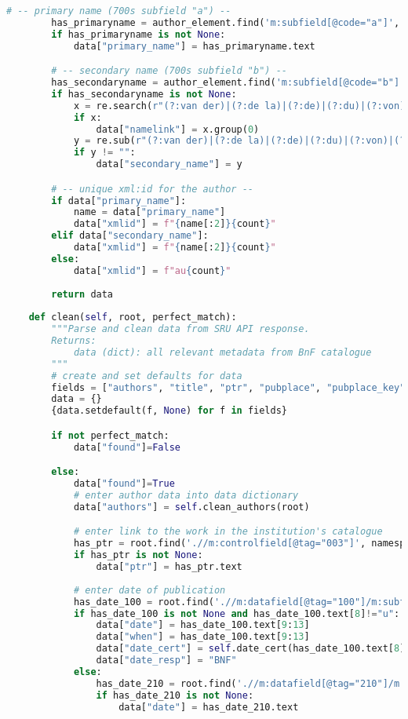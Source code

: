 \documentclass[class=article, crop=false]{standalone}
\begin{document}
\begin{lstlisting}[language=python, style=python]
        # -- primary name (700s subfield "a") --
        has_primaryname = author_element.find('m:subfield[@code="a"]', namespaces=NS)
        if has_primaryname is not None:
            data["primary_name"] = has_primaryname.text

        # -- secondary name (700s subfield "b") --
        has_secondaryname = author_element.find('m:subfield[@code="b"]', namespaces=NS)
        if has_secondaryname is not None:
            x = re.search(r"(?:van der)|(?:de la)|(?:de)|(?:du)|(?:von)|(?:van)", has_secondaryname.text)
            if x:
                data["namelink"] = x.group(0)
            y = re.sub(r"(?:van der)|(?:de la)|(?:de)|(?:du)|(?:von)|(?:van)","", has_secondaryname.text)
            if y != "":
                data["secondary_name"] = y

        # -- unique xml:id for the author --
        if data["primary_name"]:
            name = data["primary_name"]
            data["xmlid"] = f"{name[:2]}{count}"
        elif data["secondary_name"]:
            data["xmlid"] = f"{name[:2]}{count}"
        else:
            data["xmlid"] = f"au{count}"
        
        return data
    
    def clean(self, root, perfect_match):
        """Parse and clean data from SRU API response.
        Returns:
            data (dict): all relevant metadata from BnF catalogue
        """      
        # create and set defaults for data
        fields = ["authors", "title", "ptr", "pubplace", "pubplace_key", "publisher", "date", "when", "date_cert", "date_resp", "country", "idno", "objectdesc", "lang", "repo", "settlement"]
        data = {}
        {data.setdefault(f, None) for f in fields}

        if not perfect_match:
            data["found"]=False

        else:
            data["found"]=True
            # enter author data into data dictionary
            data["authors"] = self.clean_authors(root)

            # enter link to the work in the institution's catalogue
            has_ptr = root.find('.//m:controlfield[@tag="003"]', namespaces=NS)
            if has_ptr is not None:
                data["ptr"] = has_ptr.text
            
            # enter date of publication
            has_date_100 = root.find('.//m:datafield[@tag="100"]/m:subfield[@code="a"]', namespaces=NS)
            if has_date_100 is not None and has_date_100.text[8]!="u":
                data["date"] = has_date_100.text[9:13]
                data["when"] = has_date_100.text[9:13]
                data["date_cert"] = self.date_cert(has_date_100.text[8])
                data["date_resp"] = "BNF"
            else:
                has_date_210 = root.find('.//m:datafield[@tag="210"]/m:subfield[@code="d"]', namespaces=NS)
                if has_date_210 is not None:
                    data["date"] = has_date_210.text
            

\end{lstlisting}
\end{document}
